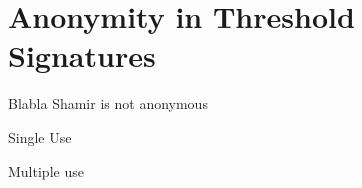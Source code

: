 \chapter{Anonymity in Threshold Signatures}
Blabla Shamir is not anonymous

Single Use

Multiple use